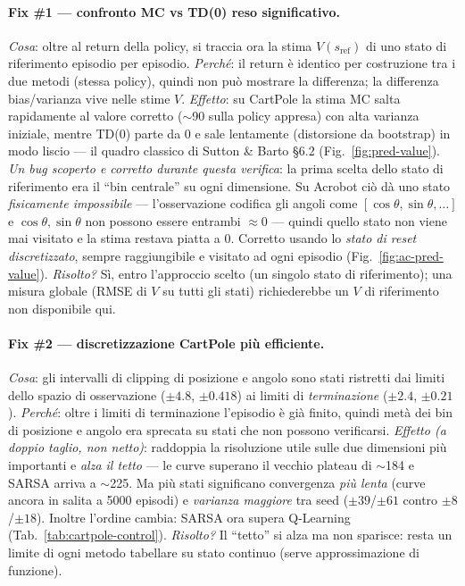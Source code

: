 \paragraph{Fix \#1 --- confronto MC vs TD(0) reso significativo.}
\emph{Cosa}: oltre al return della policy, si traccia ora la stima
$V(s_{\text{ref}})$ di uno stato di riferimento episodio per episodio.
\emph{Perch\'e}: il return \`e identico per costruzione tra i due metodi (stessa
policy), quindi non pu\`o mostrare la differenza; la differenza bias/varianza
vive nelle stime $V$.
\emph{Effetto}: su CartPole la stima MC salta rapidamente al valore corretto
($\sim$90 sulla policy appresa) con alta varianza iniziale, mentre TD(0) parte
da 0 e sale lentamente (distorsione da bootstrap) in modo liscio --- il quadro
classico di Sutton \& Barto \S6.2 (Fig.~\ref{fig:pred-value}).
\emph{Un bug scoperto e corretto durante questa verifica}: la prima scelta dello
stato di riferimento era il ``bin centrale'' su ogni dimensione. Su Acrobot ci\`o
d\`a uno stato \emph{fisicamente impossibile} --- l'osservazione codifica gli
angoli come $[\cos\theta, \sin\theta,\dots]$ e $\cos\theta,\sin\theta$ non
possono essere entrambi $\approx 0$ --- quindi quello stato non viene mai
visitato e la stima restava piatta a $0$. Corretto usando lo \emph{stato di
reset discretizzato}, sempre raggiungibile e visitato ad ogni episodio
(Fig.~\ref{fig:ac-pred-value}).
\emph{Risolto?} S\`i, entro l'approccio scelto (un singolo stato di
riferimento); una misura globale (RMSE di $V$ su tutti gli stati) richiederebbe
un $V$ di riferimento non disponibile qui.

\paragraph{Fix \#2 --- discretizzazione CartPole pi\`u efficiente.}
\emph{Cosa}: gli intervalli di clipping di posizione e angolo sono stati
ristretti dai limiti dello spazio di osservazione ($\pm4.8$, $\pm0.418$) ai
limiti di \emph{terminazione} ($\pm2.4$, $\pm0.21$).
\emph{Perch\'e}: oltre i limiti di terminazione l'episodio \`e gi\`a finito,
quindi met\`a dei bin di posizione e angolo era sprecata su stati che non
possono verificarsi.
\emph{Effetto (a doppio taglio, non netto)}: raddoppia la risoluzione utile sulle
due dimensioni pi\`u importanti e \emph{alza il tetto} --- le curve superano il
vecchio plateau di $\sim$184 e SARSA arriva a $\sim$225. Ma pi\`u stati
significano convergenza \emph{pi\`u lenta} (curve ancora in salita a 5000
episodi) e \emph{varianza maggiore} tra seed ($\pm 39$/$\pm 61$ contro
$\pm 8$/$\pm 18$). Inoltre l'ordine cambia: SARSA ora supera Q\hbox{-}Learning
(Tab.~\ref{tab:cartpole-control}).
\emph{Risolto?} Il ``tetto'' si alza ma non sparisce: resta un limite di ogni
metodo tabellare su stato continuo (serve approssimazione di funzione).

